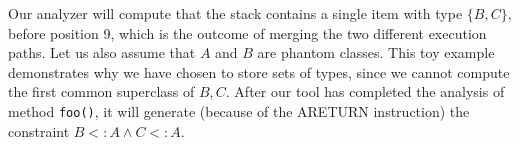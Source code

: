 Our analyzer will compute that the stack contains a single item with
type $\{B,C\}$, before position 9, which is the outcome of merging the
two different execution paths. Let us also assume that $A$ and $B$ are
phantom classes. This toy example demonstrates why we have chosen to
store sets of types, since we cannot compute the first common
superclass of $B,C$. After our tool has completed the analysis of
method \texttt{foo()}, it will generate (because of the ARETURN
instruction) the constraint $B <: A \land C <: A$.








